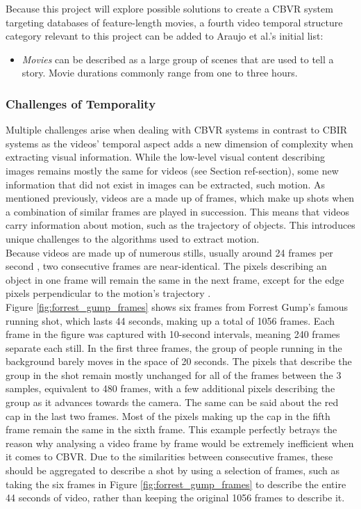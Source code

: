 Because this project will explore possible solutions to create a CBVR system targeting databases of feature-length movies, a fourth video temporal structure category relevant to this project can be added to Araujo et al.'s initial list:
\begin{itemize}
    \item \textit{Movies} can be described as a large group of scenes that are used to tell a story. Movie durations commonly range from one to three hours.
\end{itemize}

\subsubsection{Challenges of Temporality}

Multiple challenges arise when dealing with CBVR systems in contrast to CBIR systems as the videos' temporal aspect adds a new dimension of complexity when extracting visual information. While the low-level visual content describing images remains mostly the same for videos (see Section ref-section), some new information that did not exist in images can be extracted, such motion. As mentioned previously, videos are a made up of frames, which make up shots when a combination of similar frames are played in succession. This means that videos carry information about motion, such as the trajectory of objects. This introduces unique challenges to the algorithms used to extract motion.\\

Because videos are made up of numerous stills, usually around 24 frames per second \cite{brownlow1980silentfilm}, two consecutive frames are near-identical. The pixels describing an object in one frame will remain the same in the next frame, except for the edge pixels perpendicular to the motion's trajectory \cite{bradski2008opencv}.\\

Figure \ref{fig:forrest_gump_frames} shows six frames from Forrest Gump's famous running shot, which lasts 44 seconds, making up a total of 1056 frames. Each frame in the figure was captured with 10-second intervals, meaning 240 frames separate each still. In the first three frames, the group of people running in the background barely moves in the space of 20 seconds. The pixels that describe the group in the shot remain mostly unchanged for all of the frames between the 3 samples, equivalent to 480 frames, with a few additional pixels describing the group as it advances towards the camera. The same can be said about the red cap in the last two frames. Most of the pixels making up the cap in the fifth frame remain the same in the sixth frame. This example perfectly betrays the reason why analysing a video frame by frame would be extremely inefficient when it comes to CBVR. Due to the similarities between consecutive frames, these should be aggregated \cite{araujo2017i2v} to describe a shot by using a selection of frames, such as taking the six frames in Figure \ref{fig:forrest_gump_frames} to describe the entire 44 seconds of video, rather than keeping the original 1056 frames to describe it.

